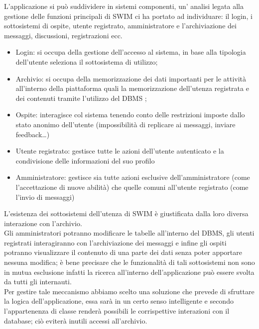 L'applicazione si può suddividere in sistemi componenti, un' analisi legata alla gestione delle funzioni principali di SWIM ci ha portato ad individuare: il login, i sottosistemi di ospite, utente registrato, amministratore e l’archiviazione dei messaggi, discussioni, registrazioni ecc.
\begin{itemize}
\item Login: si occupa della gestione dell’accesso al sistema, in base alla tipologia dell’utente seleziona il sottosistema di utilizzo; 
\item Archivio: si occupa della memorizzazione dei dati importanti per le attività all'interno della piattaforma quali la memorizzazione dell'utenza registrata e dei contenuti tramite l'utilizzo del DBMS ; 
\item Ospite: interagisce col sistema tenendo conto delle restrizioni imposte dallo stato anonimo dell’utente (impossibilità di replicare ai messaggi, inviare feedback…)
\item Utente registrato: gestisce tutte le azioni dell’utente autenticato e la condivisione delle informazioni del suo profilo
\item Amministratore: gestisce sia tutte azioni esclusive dell’amministratore (come l’accettazione di nuove abilità) che quelle comuni all’utente registrato (come l’invio di messaggi)
\end{itemize}

L’esistenza dei sottosistemi dell’utenza di SWIM è giustificata dalla loro diversa interazione con l’archivio.\\[1\baselineskip]Gli amministratori potranno modificare le tabelle all’interno del DBMS, gli utenti registrati interagiranno con l’archiviazione dei messaggi e infine gli ospiti potranno visualizzare il contenuto di una parte dei dati senza poter apportare nessuna modifica; è bene precisare che le funzionalità di tali sottosistemi non sono in mutua esclusione infatti la ricerca all'interno dell'applicazione può essere svolta da tutti gli internauti. \\[1\baselineskip]Per gestire tale meccanismo abbiamo scelto una soluzione che prevede di sfruttare la logica dell’applicazione, essa sarà in un certo senso intelligente e secondo l’appartenenza di classe renderà possibili le corrispettive interazioni con il database; ciò eviterà inutili accessi all'archivio.

\clearpage

